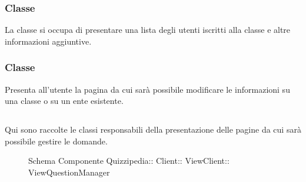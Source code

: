 \subsubsection{Classe }
La classe si occupa di presentare una lista degli utenti iscritti alla classe e altre informazioni aggiuntive.
\begin{itemize}
\end{itemize}
\subsubsection{Classe }
Presenta all'utente la pagina da cui sarà possibile modificare le informazioni su una classe o su un ente esistente.
\begin{itemize}
\end{itemize}
\subsection{}
Qui sono raccolte le classi responsabili della presentazione delle pagine da cui sarà possibile gestire le domande.
\begin{figure}[H]
\centering
\noindent{}
\caption[Schema Componente ViewQuestionManager]{Schema Componente Quizzipedia:: Client:: ViewClient:: ViewQuestionManager}
\end{figure}
